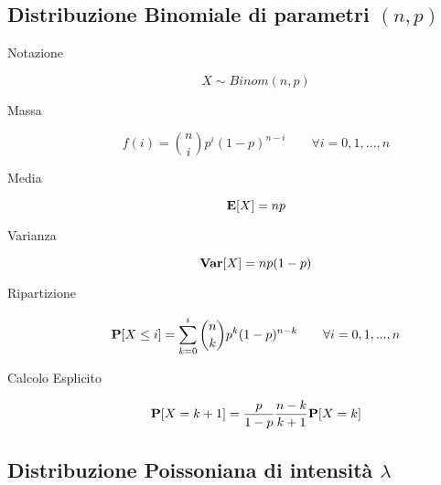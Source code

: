 \subsection{Distribuzione Binomiale di parametri $(n,p)$}

\begin{description}
	
	\item [Notazione]
		\begin{equation}
		X \sim Binom(n,p)
		\end{equation}
		
	\item [Massa]
		\begin{equation}
		f(i) = \binom{n}{i}p^{i}(1-p)^{n-i} \qquad\forall i=0,1,...,n
		\end{equation}
	
	\item [Media]
		\begin{equation}
		\mathbf{E}[X]=np
		\end{equation}
		
	\item [Varianza]
		\begin{equation}
		\mathbf{Var}[X]=np(1-p)
		\end{equation}
		
	\item [Ripartizione]
		\begin{equation}
		\mathbf{P}[X\leq i]=\sum_{k=0}^{i}\binom{n}{k}p^{k}(1-p)^{n-k} \qquad\forall i=0,1,...,n
		\end{equation}
	
	\item [Calcolo Esplicito]
		\begin{equation}
		\mathbf{P}[X=k+1]=\frac{p}{1-p}\frac{n-k}{k+1}\mathbf{P}[X=k]
		\end{equation}
\end{description}


\subsection{Distribuzione Poissoniana di intensità $\lambda$}

